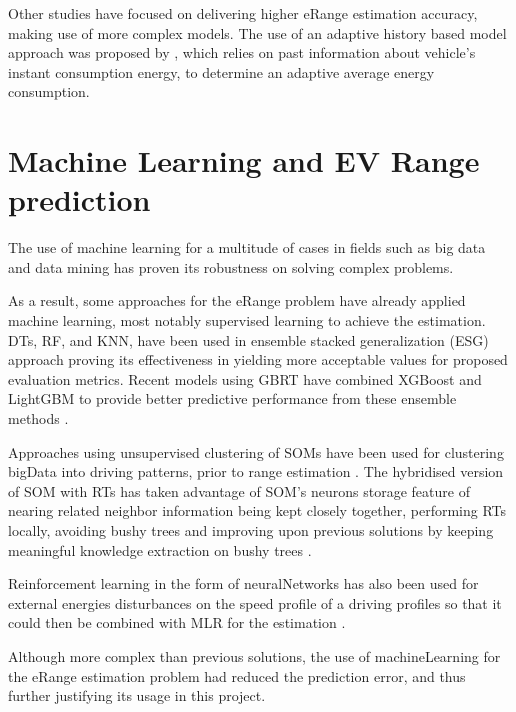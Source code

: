 Other studies have focused on delivering 
higher \gls{eRange} estimation accuracy,
making use of more complex models. 
The use of an adaptive history based model 
approach was proposed by \citep{classicEVX},
which relies on past information about
vehicle's instant consumption energy, to determine an
adaptive average energy consumption.

\section{Machine Learning and EV Range prediction}
\label{sec:stateOfArtML}

The use of machine learning for a multitude
of cases \citep{machineLearningCaseStudy} in fields such as 
big data \citep{machineLearningBigData, machineLearningBigData2}
and data mining \citep{businessDataMining} has 
proven its robustness on solving complex problems.


As a result, some approaches for the \gls{eRange}
problem have already applied machine learning,
most notably supervised learning to achieve the estimation.
\Glspl{DT}, \gls{RF}, and \gls{KNN}, have been 
used in ensemble stacked generalization (ESG) approach 
\citep{eRangeMachineLearningEnsemble} proving its 
effectiveness in yielding more acceptable values
for proposed evaluation metrics.
Recent models using \gls{GBRT} have
combined \gls{XGBoost} and \gls{LightGBM} 
to provide better predictive performance
from these ensemble methods 
\citep{machineLearningERangeGradientBoostRts}.

Approaches using unsupervised clustering 
of \glspl{SOM} have been used for clustering \gls{bigData} 
into driving patterns, prior to range estimation 
\citep{eRangeMachineLearningGHSOM}.
The hybridised version of \gls{SOM} with \glspl{RT} 
has taken advantage of \gls{SOM}'s neurons storage 
feature of nearing related neighbor information
being kept closely together, performing \glspl{RT}
locally, avoiding bushy trees and improving
upon previous solutions by keeping meaningful
knowledge extraction on bushy trees
\citep{machineLearningERangeSOMandRts}.

Reinforcement learning in the form of \gls{neuralNetworks}
has also been used for external energies 
disturbances on the speed profile of a driving profiles 
so that it could then be combined with \gls{MLR} 
for the estimation \citep{eRangeMachineLearningNeuralnetworkMLR}.

Although more complex than previous solutions, 
the use of \gls{machineLearning} for the 
\gls{eRange} estimation problem had reduced 
the prediction error, and thus further justifying
its usage in this project.  


